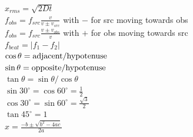 \documentclass[letterpaper,addpoints,answers]{exam}
\begin{document}
\begin{multicols}{2}
 $x_{rms} = \sqrt{2 D t}$ \\
 $f_{obs} = f_{src} \frac{v}{v \pm v_{src}}$ with $-$ for src moving towards obs \\
 $f_{obs} = f_{src} \frac{v \pm v_{obs}}{v}$ with $+$ for obs moving towards src \\
 $f_{beat} = |f_1 - f_2|$ \\
 $\cos\theta = \hbox{adjacent}/\hbox{hypotenuse}$ \\
 $\sin\theta = \hbox{opposite}/\hbox{hypotenuse}$ \\
 $\tan\theta = \sin\theta / \cos\theta$ \\
 $\sin 30^\circ = \cos 60^\circ = \frac{1}{2}$ \\
 $\cos 30^\circ = \sin 60^\circ = \frac{\sqrt{3}}{2}$ \\
 $\tan 45^\circ = 1$ \\
 $x = \frac{-b \pm \sqrt{b^2 - 4 a c}}{2 a}$ \\


\end{multicols}
\end{document}
